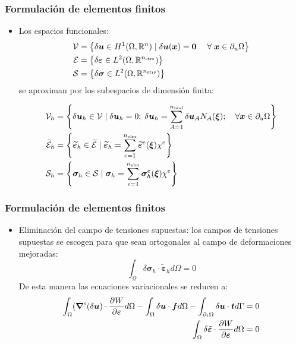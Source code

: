 \documentclass[handout]{beamer}
\begin{document}
\begin{frame}
\frametitle{Formulación de elementos finitos}
\begin{itemize}
\item Los espacios funcionales:
\begin{align*}
{\cal V}&=\left\{
\delta \bm{u} \in H^1(\Omega,\mathbb{R}^n) \mid \delta \bm{u}(\bm{x})=\bm{0} \;
\quad \forall \; \bm{x} \in \partial_u \Omega
\right\}       \\
{\cal E}&=\left\{
\delta \bm{\varepsilon} \in L^2(\Omega,\mathbb{R}^{n_{\rm strs}})
\right\}       \\
{\cal S}&=\left\{
\delta \bm{\sigma} \in L^2(\Omega,\mathbb{R}^{n_{\rm strs}})
\right\}   
\end{align*}
se aproximan por los subespacios de dimensión finita:
\begin{small}
\begin{align*}
{\cal V}_{h}&=\left\{
\delta \bm{u}_{h} \in {\cal V} \mid \delta \bm{u}_{h}=0; \;
\delta \bm{u}_{h}=\sum_{A=1}^{n_{\textrm{nod}}}
\delta \bm{u}_{A}N_{A}(\bm{\xi});\quad
\forall \bm{x} \in \partial_u \Omega
\right\}               \\
{\widetilde {\cal E}}_{h}&=\left\{
\widetilde{\bm{\varepsilon}}_{h} \in {\widetilde{\cal E}} \mid
\widetilde{\bm{\varepsilon}}_{h}=\sum_{e=1}^{n_{\rm elm}}
\widetilde{\bm{\varepsilon}}^{e} (\bm{\xi}) \chi^{e}
\right\}   \\
{\cal S}_{h}&=\left\{
\bm{\sigma}_{h} \in {\cal S} \mid
\bm{\sigma}_{h}=\sum_{e=1}^{n_{\textrm{elm}}} \bm{\sigma}_{h}^{e}(\bm{\xi}) \chi^{e}
\right\}
\end{align*}
\end{small}
\end{itemize}
\end{frame}
\begin{frame}
\frametitle{Formulación de elementos finitos}
\begin{itemize}
\item Eliminación del campo de tensiones supuestas: los campos de tensiones
supuestas se escogen para que sean ortogonales al campo de deformaciones
mejoradas:
$$
\int_{\Omega} 
\delta \bm{\sigma}_{h} \cdot \tilde{\bm{\varepsilon}}_{h} d\Omega=0
$$
De esta manera las ecuaciones variacionales se reducen a:
\begin{align*}
\int_{\Omega} 
(\bm{\nabla}^{\rm s} (\delta \bm{u})\cdot \frac{\partial W}{\partial \bm{\varepsilon}}d \Omega
-\int_{\Omega} \delta \bm{u} \cdot \bm{f} d \Omega-
\int_{\partial_{t} \Omega} \delta \bm{u} \cdot \bm{t} d \Gamma&=0 \\
\int_{\Omega} 
\delta \tilde{\bm{\varepsilon}} \cdot 
\frac{\partial W}{\partial \bm{\varepsilon}}
d\Omega&=0
\end{align*}
\end{itemize}
\end{frame}
\end{document}
